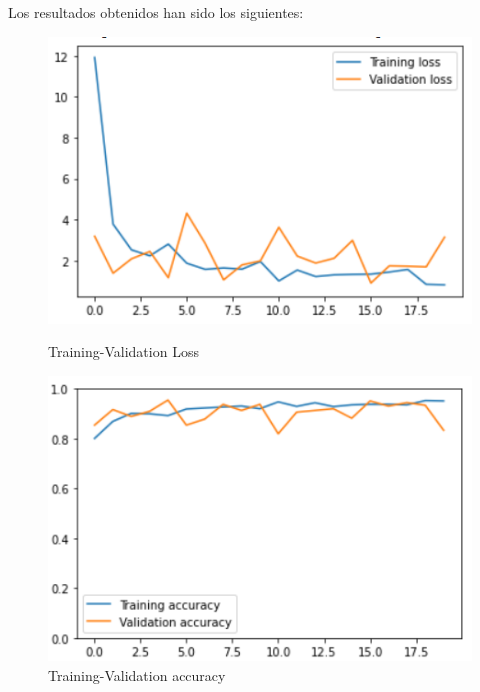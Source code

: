 \documentclass[11pt,a4paper]{article}
\theoremstyle{definition}
\begin{document}
Los resultados obtenidos han sido los siguientes:

\begin{figure}[H]
  \centering
  \begin{minipage}[b]{0.45\textwidth}
    \includegraphics[scale=0.75]{./images/v1loss}
	\caption{Training-Validation Loss}
  \end{minipage}
  \hfill
  \begin{minipage}[b]{0.45\textwidth}
    \includegraphics[scale=0.75]{./images/v1acc}
	\caption{Training-Validation accuracy}
  \end{minipage}
\end{figure}
\end{document}
